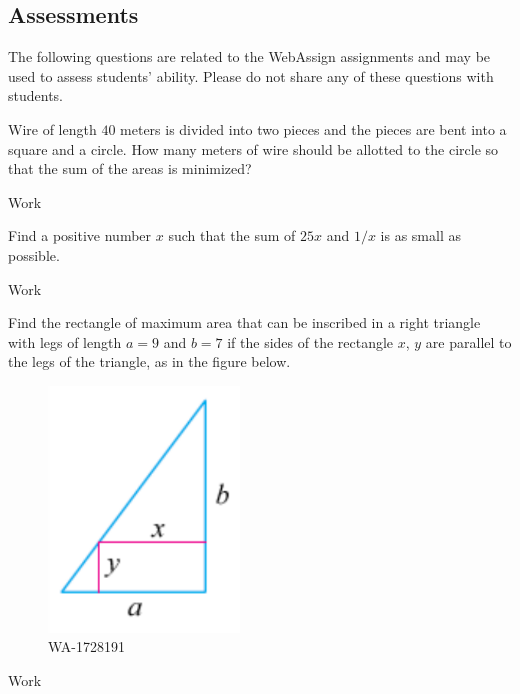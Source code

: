 \documentclass[12pt,addpoints, answers, fleqn]{exam}
\begin{document}
\begin{teacher}
\subsection{Assessments}
The following questions are related to the WebAssign assignments and may be used to assess students' ability. Please do not share any of these questions with students.
\begin{questions}		
\question 	%

Wire of length $40$ meters is divided into two pieces and the pieces are bent into a square and a circle. How many meters of wire should be allotted to the circle so that the sum of the areas is minimized?
\begin{solution}
Work
\end{solution}

\question 	%

Find a positive number $x$ such that the sum of $25x$ and $1/x$ is as small as possible.
 
 \begin{solution}
Work
\end{solution}

\question 	%

Find the rectangle of maximum area that can be inscribed in a right triangle with legs of length $a = 9$ and $b = 7$ if the sides of the rectangle $x$, $y$ are parallel to the legs of the triangle, as in the figure below.
\begin{figure}[htbp] %
   \centering
   \includegraphics[width=2in]{./graphics/1728191.pdf} 
   \caption{WA-1728191}
   \label{fig:1728191}
\end{figure}
 
\begin{solution}
Work
\end{solution}


\end{questions}
\end{teacher}
\end{document}
